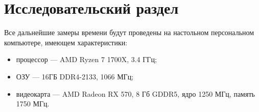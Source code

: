\section{Исследовательский раздел}
Все дальнейшие замеры времени будут проведены на настольном персональном компьютере, имеющем характеристики:
\begin{itemize}
	\item процессор --- AMD Ryzen 7 1700X, 3.4 ГГц;
	\item ОЗУ --- 16ГБ DDR4-2133, 1066 МГц;
	\item видеокарта --- AMD Radeon RX 570, 8 Гб GDDR5, ядро 1250 МГц, память 1750 МГц.
\end{itemize}


